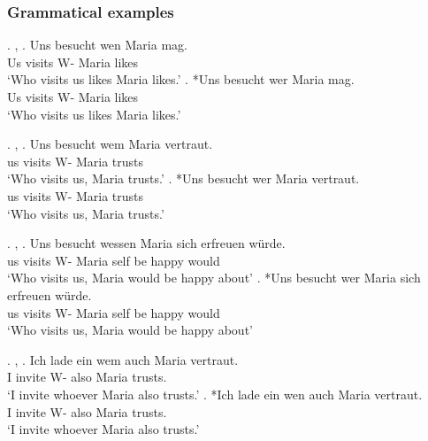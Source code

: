 \subsubsection{Grammatical examples}

\ex. , 
\ag. Uns besucht wen Maria mag.\\
 Us visits\scsub{[nom]} W- Maria likes\\
 `Who visits us likes Maria likes.' \hfill \citep[344]{vogel2001}
\bg. *Uns besucht wer Maria mag.\\
 Us visits\scsub{[nom]} W- Maria likes\\
 `Who visits us likes Maria likes.' \hfill \citep[344]{vogel2001}

\ex. , 
\ag. Uns besucht wem Maria vertraut.\\
 us visits\scsub{[nom]} W- Maria trusts\\
 `Who visits us, Maria trusts.' \hfill \citep[343]{vogel2001}
\bg. *Uns besucht wer Maria vertraut.\\
 us visits\scsub{[nom]} W- Maria trusts\\
 `Who visits us, Maria trusts.' \hfill \citep[343]{vogel2001}

\ex. , 
\ag. Uns besucht wessen Maria sich erfreuen würde.\\
 us visits\scsub{[nom]} W- Maria self {be happy}\scsub{[gen]} would\\
 `Who visits us, Maria would be happy about' \hfill \citep[344]{vogel2001}
\bg. *Uns besucht wer Maria sich erfreuen würde.\\
 us visits\scsub{[nom]} W- Maria self {be happy}\scsub{[gen]} would\\
 `Who visits us, Maria would be happy about' \hfill \citep[344]{vogel2001}

\ex. , 
\ag. Ich {lade ein} wem auch Maria vertraut. \\
 I invite\scsub{[acc]} W- also Maria trusts.\\
 `I invite whoever Maria also trusts.' \hfill \citep[344]{vogel2001}
\bg. *Ich {lade ein} wen auch Maria vertraut. \\
 I invite\scsub{[acc]} W- also Maria trusts.\\
 `I invite whoever Maria also trusts.' \hfill \citep[344]{vogel2001}

